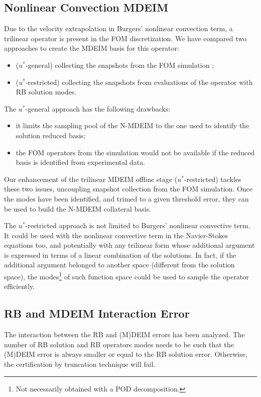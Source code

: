 \documentclass[thesis.tex]{subfiles}
\begin{document}
\subsection{Nonlinear Convection MDEIM}
Due to the velocity extrapolation in Burgers' nonlinear convection term,
a trilinear operator is present in the FOM discretization.
We have compared two approaches to create the MDEIM basis for this operator:
\begin{itemize}
    \item (\mbox{$u^{*}$-general}) collecting the snapshots from the FOM simulation \cite{Santo_Manzoni_2019};
    \item (\mbox{$u^{*}$-restricted}) collecting the snapshots from evaluations of the operator with RB solution modes.
\end{itemize}
The \mbox{$u^{*}$-general} approach has the following drawbacks:
\begin{itemize}
    \item it limits the sampling pool of the \mbox{N-MDEIM} to 
    the one used to identify the solution reduced basis;
    \item the FOM operators from the simulation would not be available 
    if the reduced basis is identified from experimental data.
\end{itemize}
Our enhancement of the trilinear MDEIM offline stage (\mbox{$u^{*}$-restricted})
tackles these two issues, uncoupling snapshot collection from the FOM simulation.
Once the modes have been identified, and trimed to a given threshold error,
they can be used to build the \mbox{N-MDEIM} collateral basis.

The \mbox{$u^{*}$-restricted} approach is not limited to Burgers' nonlinear convective term.
It could be used with the nonlinear convective term in the Navier-Stokes equations too,
and potentially with any trilinear form whose additional argument is expressed
in terms of a linear combination of the solutions.
In fact, if the additional argument belonged to another space (different from the solution space),
the modes\footnote{Not necessarily obtained with a POD decomposition.} of such function space could be used to sample the operator efficiently.

\subsection{RB and MDEIM Interaction Error}
The interaction between the RB and (M)DEIM errors has been analyzed.
The number of RB solution and RB operators modes needs to be such that
the (M)DEIM error is always smaller or equal to the RB solution error.
Otherwise, the certification by truncation technique will fail.
\end{document}
